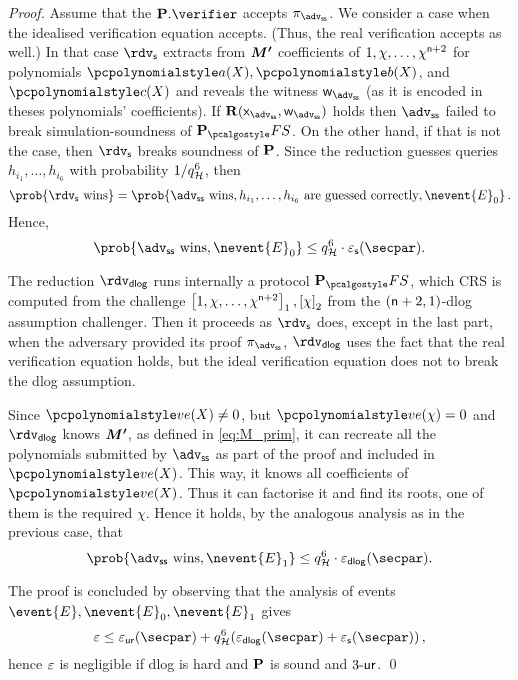 \documentclass[runningheads,11pt]{llncs}
\let\spvec\vec
\let\vec\accentvec
\let\vec\spvec
\def\vec#1{\mathchoice{\mbox{\boldmath$\displaystyle#1$}}
	{\mbox{\boldmath$\textstyle#1$}}
	{\mbox{\boldmath$\scriptstyle#1$}}
	{\mbox{\boldmath$\scriptscriptstyle#1$}}}
\theoremstyle{definition}
\begin{document}
\begin{proof}
Assume that the $\plonkprot.\verifier$ accepts $\zkproof_\advss$. We consider a case when the idealised verification equation accepts. (Thus, the real verification accepts as well.) 
In that case $\rdvs$ extracts from $\vec{M'}$ coefficients of $1, \chi, \ldots, \chi^{\mathsf{n} + 2}$ for polynomials $\p{a}(X), \p{b}(X)$, and $\p{c}(X)$ and reveals the witness $\wit_\advss$ (as it is encoded in theses polynomials' coefficients).
If $\REL(\inp_\advss, \wit_\advss)$ holds then $\advss$ failed to break simulation-soundness of $\plonkprotfs$. On the other hand, if that is not the case, then $\rdvs$ breaks soundness of $\mathbf{P}$.
%
Since the reduction guesses queries $h_{i_1}, \ldots, h_{i_6}$ with probability $1/q_{\mathcal{H}}^6$, then 
\[
	\prob{\rdvs \text{ wins}} = \prob{\advss \text{ wins}, h_{i_1}, \ldots, h_{i_6} \text{ are guessed correctly}, \nevent{E}_0}\,.
\] 
Hence,
\[
	\prob{\advss \text{ wins}, \nevent{E}_0} \leq q_\ro^6 \cdot \epss(\secpar).
\]

The reduction $\rdvdlog$ runs internally a protocol $\plonkprotfs$, which CRS is computed from the challenge $\left[1, \chi, \ldots, \chi^{\mathsf{n} + 2}\right]_{1}, \left[\chi\right]_{2}$ from the $(\mathsf{n} + 2, 1)$-dlog assumption challenger. 
Then it proceeds as $\rdvs$ does, except in the last part, when the adversary provided its proof $\zkproof_\advss$, $\rdvdlog$ uses the fact that the real verification equation holds, but the ideal verification equation does not to break the dlog assumption. 

Since $\vereq(X) \neq 0$, but $\vereq(\chi) = 0$ and $\rdvdlog$ knows
$\vec{M'}$, as defined in \cref{eq:M_prim}, it can recreate all the polynomials
submitted by $\advss$ as part of the proof and included in $\vereq(X)$. This
way, it knows all coefficients of $\vereq(X)$. Thus it can factorise it and find
its roots, one of them is the required $\chi$. Hence it holds, by the analogous analysis as in the previous case, that
\[
	\prob{\advss \text{ wins}, \nevent{E}_1} \leq q_\ro^6 \cdot \eps_{\dlog}(\secpar).
\]

The proof is concluded by observing that the analysis of events $\event{E}, \nevent{E}_0, \nevent{E}_1$ gives
\[
	\eps \leq \epsur(\secpar) + q_\ro^6 (\eps_{\dlog}(\secpar) + \epss(\secpar))\,,
\]
hence $\varepsilon$ is negligible if dlog is hard and $\mathbf{P}$ is sound and ${3\text{-}\mathsf{ur}}$.
\qed
\end{proof}





\end{document}
